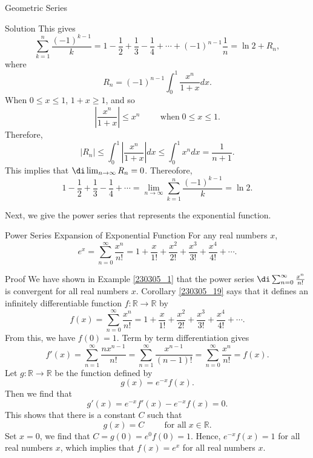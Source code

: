 \begin{example}[label=230305_16]{Geometric Series}
\begin{example}[label=230304_9]{}
\begin{example}{}
\begin{solution}{Solution}
This gives
\[ \sum_{k=1}^n\frac{(-1)^{k-1}}{k}=1-\frac{1}{2}+\frac{1}{3}-\frac{1}{4}+\cdots +(-1)^{n-1}\frac{1}{n}=\ln 2+R_n,\]
where
\[R_n=(-1)^{n-1}\int_0^1\frac{x^{n}}{1+x}dx.\]
  When  $0\leq x\leq 1$, $1+x\geq 1$, and so
\[\left| \frac{x^{n}}{1+x}\right|\leq x^n\hspace{1cm}\text{when}\;0\leq x\leq 1.\]
Therefore,
\[|R_n|\leq\int_0^1\left| \frac{x^{n}}{1+x}\right|dx\leq \int_0^1x^ndx=\frac{1}{n+1}.\]
This implies that
$\di \lim_{n\to\infty}R_n=0$. Thereofore,
\[1-\frac{1}{2}+\frac{1}{3}-\frac{1}{4}+\cdots=\lim_{n\to\infty}\sum_{k=1}^n\frac{(-1)^{k-1}}{k}=\ln2.\] 
\end{solution}
 
Next, we give the power series that represents the exponential function.
\begin{theorem}[label=230307_6]{Power Series Expansion of Exponential Function}
For any real numbers $x$,
\[e^x=\sum_{n=0}^{\infty}\frac{x^n}{n!}=1+\frac{x}{1!}+\frac{x^2}{2!}+\frac{x^3}{3!}+\frac{x^4}{4!}+\cdots.\]
\end{theorem}
\begin{myproof}{Proof}
We have shown in Example \ref{230305_1} that the power series $\di\sum_{n=0}^{\infty}\frac{x^n}{n!}$ is convergent for all real numbers $x$.  Corollary \ref{230305_19} says that it defines an infinitely differentiable function $f:\mathbb{R}\to\mathbb{R}$ by
\[f(x)=\sum_{n=0}^{\infty}\frac{x^n}{n!}=1+\frac{x}{1!}+\frac{x^2}{2!}+\frac{x^3}{3!}+\frac{x^4}{4!}+\cdots.\]From this, we have $f(0)=1$. Term by term differentiation gives
\[f'(x)=\sum_{n=1}^{\infty}\frac{nx^{n-1}}{n!}=\sum_{n=1}^{\infty}\frac{x^{n-1}}{(n-1)!}=\sum_{n=0}^{\infty}\frac{x^n}{n!}=f(x).\]
Let $g:\mathbb{R}\to\mathbb{R}$ be the function defined by
\[g(x)=e^{-x}f(x).\]
Then we find that
\[g'(x)=e^{-x}f'(x)-e^{-x}f(x)=0.\]
This shows that there is a constant $C$ such that
\[g(x)=C\hspace{1cm}\text{for all}\;x\in\mathbb{R}.\]
Set $x=0$, we find that $C=g(0)=e^{0}f(0)=1$. Hence, $e^{-x}f(x)=1$ for all real numbers $x$, which implies that $f(x)=e^x$ for all real numbers $x$.
\end{myproof}


\end{example}
\end{example}
\end{example}
